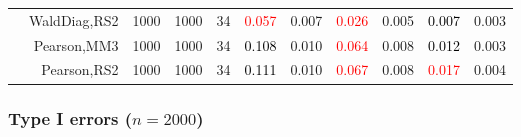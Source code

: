 \documentclass[
]{article}
\begin{document}
\begin{table}[H]
{\begin{tabular}[t]{lrrrrrrrlrr}
\hspace{1em} & WaldDiag,RS2 & 1000 & 1000 & 34 & \textcolor{red}{0.057} & 0.007 & \textcolor{red}{0.026} & 0.005 & \textcolor{black}{0.007} & 0.003\\

\hspace{1em} & Pearson,MM3 & 1000 & 1000 & 34 & \textcolor{black}{0.108} & 0.010 & \textcolor{red}{0.064} & 0.008 & \textcolor{black}{0.012} & 0.003\\

\hspace{1em} & Pearson,RS2 & 1000 & 1000 & 34 & \textcolor{black}{0.111} & 0.010 & \textcolor{red}{0.067} & 0.008 & \textcolor{red}{0.017} & 0.004\\
\bottomrule
\end{tabular}}
\endgroup{}
\end{table}

\hypertarget{type-i-errors-n2000}{%
\subsubsection{\texorpdfstring{Type I errors
(\(n=2000\))}{Type I errors (n=2000)}}\label{type-i-errors-n2000}}
\end{document}
